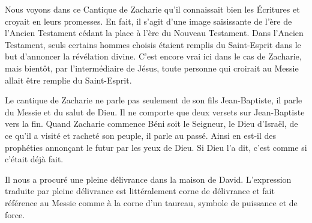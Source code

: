 

Nous voyons dans ce Cantique de Zacharie qu'il connaissait bien les Écritures et croyait en leurs promesses. En fait, il s'agit d'une image saisissante de l'ère de l'Ancien Testament cédant la place à l'ère du Nouveau Testament. Dans l'Ancien Testament, seuls certains hommes choisis étaient remplis du Saint-Esprit dans le but d'annoncer la révélation divine. C'est encore vrai ici dans le cas de Zacharie, mais bientôt, par l'intermédiaire de Jésus, toute personne qui croirait au Messie allait être remplie du Saint-Esprit.

Le cantique de Zacharie ne parle pas seulement de son fils Jean-Baptiste, il parle du Messie et du salut de Dieu. Il ne comporte que deux versets sur Jean-Baptiste vers la fin. Quand Zacharie commence\frcolon{} \Og Béni soit le Seigneur, le Dieu d’Israël, de ce qu’il a visité et racheté son peuple\Fg{}, il parle au passé. Ainsi en est-il des prophéties annonçant le futur par les yeux de Dieu. Si Dieu l'a dit, c'est comme si c'était déjà fait.

Il \Og nous a procuré une pleine délivrance dans la maison de David. \Fg{} L'expression traduite par \Og pleine délivrance \Fg{} est littéralement \Og corne de délivrance \Fg{} et fait référence au Messie comme à la corne d'un taureau, symbole de puissance et de force.

